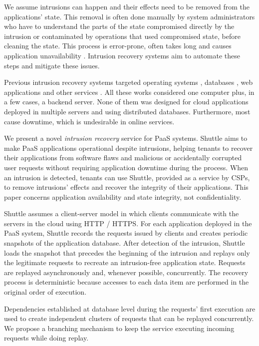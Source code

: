 We  assume intrusions can happen and their effects need to be removed from the applications' state. This removal is often done manually by system administrators who have to understand the parts of the state compromised directly by the intrusion or contaminated by operations that used compromised state, before cleaning the state. This process is error-prone, often takes long and causes application unavailability \cite{Brown2001}. Intrusion recovery systems aim to automate these steps and mitigate these issues.

Previous intrusion recovery systems targeted operating systems \cite{taser,retro,dare}, databases \cite{itdb,phoenix}, web applications \cite{Akkus2010,warp,aire} and other services \cite{undoForOperators}. All these works considered one computer plus, in a few cases, a backend server. None of them was designed for cloud applications deployed in multiple servers and using distributed databases. Furthermore, most cause downtime, which is undesirable in online services.

We present a novel \emph{intrusion recovery} service for \ac{PaaS} systems. Shuttle aims to make \ac{PaaS} applications operational despite intrusions, helping tenants to recover their applications from software flaws and malicious or accidentally corrupted user requests without requiring application downtime during the process. When an intrusion is detected, tenants can use Shuttle, provided as a service by CSPs, to remove intrusions' effects and recover the integrity of their applications. This paper concerns application availability and state integrity, not confidentiality.

Shuttle assumes a client-server model in which clients communicate with the servers in the cloud using HTTP / HTTPS. For each application deployed in the \ac{PaaS} system, Shuttle records the requests issued by clients and creates periodic snapshots of the application database. 
After detection of the intrusion, Shuttle loads the snapshot that precedes the beginning of the intrusion and replays only the legitimate requests to recreate an intrusion-free application state. Requests are replayed asynchronously and, whenever possible, concurrently. The recovery process is deterministic because accesses to each data item are performed in the original order of execution.

Dependencies established at database level during the requests' first execution are used to create independent clusters of requests that can be replayed concurrently. We propose a branching mechanism to keep the service executing incoming requests while doing replay.

